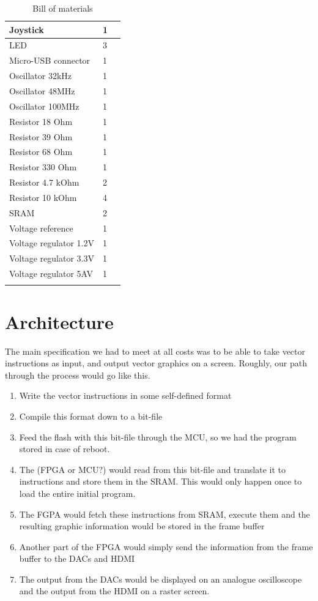 \begin{longtable}{| p{5cm} | p{2cm} | p{2cm} |}
	Joystick & 1 &\\ \hline
	LED & 3 &\\ \hline
	Micro-USB connector & 1 &\\ \hline
	Oscillator 32kHz & 1 &\\ \hline
	Oscillator 48MHz & 1 &\\ \hline
	Oscillator 100MHz & 1 &\\ \hline
	Resistor 18 Ohm & 1 &\\ \hline
	Resistor 39 Ohm & 1 &\\ \hline
	Resistor 68 Ohm & 1 &\\ \hline
	Resistor 330 Ohm & 1 &\\ \hline
	Resistor 4.7 kOhm & 2 &\\ \hline
	Resistor 10 kOhm & 4 &\\ \hline
	SRAM & 2 &\\ \hline
	Voltage reference & 1 &\\ \hline
	Voltage regulator 1.2V & 1 &\\ \hline
	Voltage regulator 3.3V & 1 &\\ \hline
	Voltage regulator 5AV & 1 &\\
	\hline
	\caption{Bill of materials}
	\label{tab:bom}
\end{longtable}

\section{Architecture}
The main specification we had to meet at all costs was to be able to take vector instructions as input, and output vector graphics on a screen. Roughly, our path through the process would go like this. 
\begin{enumerate}
\item Write the vector instructions in some self-defined format
\item Compile this format down to a bit-file
\item Feed the flash with this bit-file through the MCU, so we had the program stored in case of reboot. 
\item The (FPGA or MCU?) would read from this bit-file and translate it to instructions and store them in the SRAM. This would only happen once to load the entire initial program.
\item The FGPA would fetch these instructions from SRAM, execute them and the resulting graphic information would be stored in the frame buffer
\item Another part of the FPGA would simply send the information from the frame buffer to the DACs and HDMI
\item The output from the DACs would be displayed on an analogue oscilloscope and the output from the HDMI on a raster screen.
\end{enumerate}

